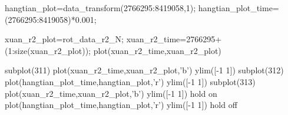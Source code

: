 hangtian_plot=data_transform(2766295:8419058,1);
hangtian_plot_time=(2766295:8419058)*0.001;

xuan_r2_plot=rot_data_r2_N;
xuan_r2_time=2766295+(1:size(xuan_r2_plot));
plot(xuan_r2_time,xuan_r2_plot)



subplot(311)
plot(xuan_r2_time,xuan_r2_plot,'b')
ylim([-1 1])
subplot(312)
plot(hangtian_plot_time,hangtian_plot,'r')
ylim([-1 1])
subplot(313)
plot(xuan_r2_time,xuan_r2_plot,'b')
ylim([-1 1])
hold on
plot(hangtian_plot_time,hangtian_plot,'r')
ylim([-1 1])
hold off